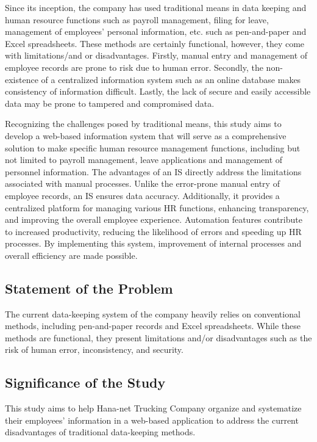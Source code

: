 \documentclass[journal]{./IEEE/IEEEtran}
\begin{document}
	Since its inception, the company has used traditional means in data keeping and human resource functions such as payroll management, filing for leave, management of employees’ personal information, etc. such as pen-and-paper and Excel spreadsheets. These methods are certainly functional, however, they come with limitations/and or disadvantages. Firstly, manual entry and management of employee records are prone to risk due to human error. Secondly, the non-existence of a centralized information system such as an online database makes consistency of information difficult. Lastly, the lack of secure and easily accessible data may be prone to tampered and compromised data. 

Recognizing the challenges posed by traditional means, this study aims to develop a web-based information system that will serve as a comprehensive solution to make specific human resource management functions, including but not limited to payroll management, leave applications and management of personnel information. The advantages of an IS directly address the limitations associated with manual processes. Unlike the error-prone manual entry of employee records, an IS ensures data accuracy. Additionally, it provides a centralized platform for managing various HR functions, enhancing transparency, and improving the overall employee experience. Automation features contribute to increased productivity, reducing the likelihood of errors and speeding up HR processes. By implementing this system, improvement of internal processes and overall efficiency are made possible.


\subsection{\textbf{Statement of the Problem}}
The current data-keeping system of the company heavily relies on conventional methods, including pen-and-paper records and Excel spreadsheets. While these methods are functional, they present limitations and/or disadvantages such as the risk of human error, inconsistency, and security.


\subsection{\textbf{Significance of the Study}}
This study aims to help Hana-net Trucking Company organize and systematize their employees' information in a web-based application to address the current disadvantages of traditional data-keeping methods. 
\end{document}
